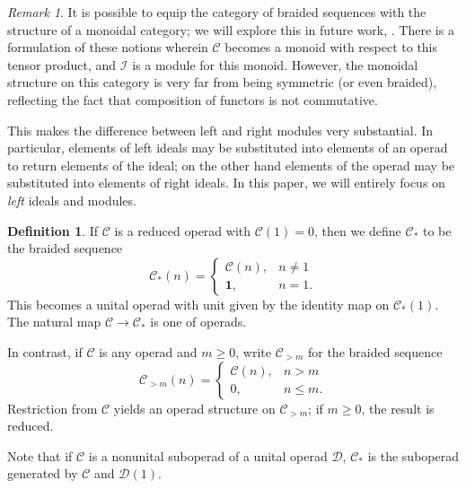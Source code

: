 \documentclass[12pt]{article}
\newcommand{\CC} {\mathcal{C}}
\newcommand{\DD} {\mathcal{D}}
\newcommand{\one} {\mathbf{1}}
\newcommand{\II}{\mathcal{I}}
\theoremstyle{plain}
\theoremstyle{definition}
\newtheorem{defn}[thm]{Definition}
\theoremstyle{remark}
\newtheorem{rem}[thm]{Remark}
\begin{document}
\begin{rem} It is possible to equip the category of braided sequences with the structure of a monoidal category; we will explore this in future work, \cite{braided_operads}.  There is a formulation of these notions wherein $\CC$ becomes a monoid with respect to this tensor product, and $\II$ is a module for this monoid.  However, the monoidal structure on this category is very far from being symmetric (or even braided), reflecting the fact that composition of functors is not commutative.  %

This makes the difference between left and right modules very substantial.  In particular, elements of left ideals may be substituted into elements of an operad to return elements of the ideal; on the other hand elements of the operad may be substituted into elements of right ideals. In this paper, we will entirely focus on \emph{left} ideals and modules. \end{rem}

\begin{defn} \label{unit_defn} If $\CC$ is a reduced operad with $\CC(1) = 0$, then we define $\CC_*$ to be the braided sequence
%
$$\CC_*(n) = \left\{\begin{array}{ll} \CC(n), & n \neq 1 \\ \one, & n=1. \end{array} \right.$$ 
%
This becomes a unital operad with unit given by the identity map on $\CC_*(1)$.  The natural map $\CC \to \CC_*$ is one of operads.

In contrast, if $\CC$ is any operad and $m\geq 0$, write $\CC_{>m}$ for the braided sequence
%
$$\CC_{>m}(n) = \left\{\begin{array}{ll} \CC(n), & n > m \\ 0, & n \leq m. \end{array} \right.$$
%
Restriction from $\CC$ yields an operad structure on $\CC_{>m}$; if $m \geq 0$, the result is reduced.

\end{defn}

Note that if $\CC$ is a nonunital suboperad of a unital operad $\DD$, $\CC_*$ is the suboperad generated by $\CC$ and $\DD(1)$.
\end{document}

